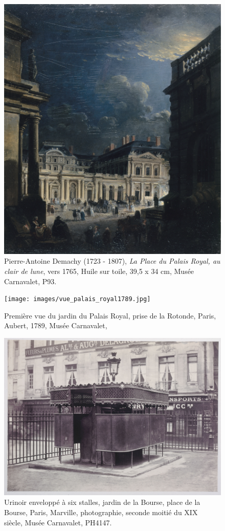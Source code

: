 \begin{figure}[ht!]
    \centering
    \includegraphics[width=0.5\linewidth]{images/palais_royal_clairdelune.jpg}
    \caption{Pierre-Antoine Demachy (1723 - 1807), \textit{La Place du Palais Royal, au clair de lune}, vers 1765, Huile sur toile, 39,5 x 34 cm, Musée Carnavalet, P93.}
    \label{fig:clair_lune}

\end{figure}
\begin{figure}[ht!]
    \centering
    \texttt{[image: images/vue\_palais\_royal1789.jpg]}
    \caption{Première vue du jardin du Palais Royal, prise de la Rotonde, Paris, Aubert, 1789, Musée Carnavalet,  }
    \label{fig:palais_royal1789}
\end{figure}

\begin{figure}[ht!]
    \centering
    \includegraphics[width=0.7\linewidth]{images/urinoir_marville.jpg}
    \caption{Urinoir enveloppé à six stalles, jardin de la Bourse, place de la Bourse, Paris, Marville, photographie, seconde moitié du XIX\ieme~ siècle, Musée Carnavalet, PH4147.}
    \label{fig:urinoir}
\end{figure}

